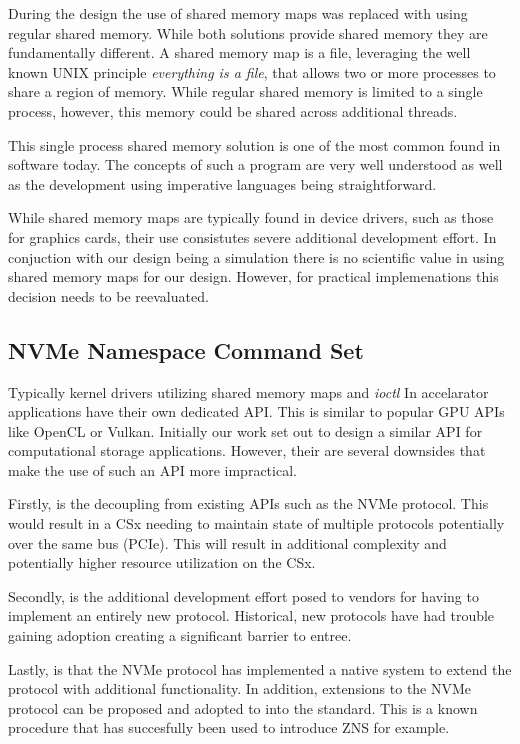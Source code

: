 During the design the use of shared memory maps was replaced with using regular
shared memory. While both solutions provide shared memory they are fundamentally
different. A shared memory map is a file, leveraging the well known UNIX
principle \textit{everything is a file}, that allows two or more processes to
share a region of memory. While regular shared memory is limited to a single
process, however, this memory could be shared across additional threads.

This single process shared memory solution is one of the most common found in
software today. The concepts of such a program are very well understood as
well as the development using imperative languages being straightforward.

While shared memory maps are typically found in device drivers, such as those
for graphics cards, their use consistutes severe additional development effort.
In conjuction with our design being a simulation there is no scientific value in
using shared memory maps for our design. However, for practical implemenations 
this decision needs to be reevaluated.

\subsection{NVMe Namespace Command Set}

Typically kernel drivers utilizing shared memory maps and \textit{ioctl} In
accelarator applications have their own dedicated API. This is similar to
popular GPU APIs like OpenCL or Vulkan. Initially our work set out to design
a similar API for computational storage applications. However, their are several
downsides that make the use of such an API more impractical.

Firstly, is the decoupling from existing APIs such as the NVMe protocol. This
would result in a CSx needing to maintain state of multiple protocols
potentially over the same bus (PCIe). This will result in additional complexity
and potentially higher resource utilization on the CSx.

Secondly, is the additional development effort posed to vendors for having to
implement an entirely new protocol. Historical, new protocols have had trouble
gaining adoption creating a significant barrier to entree.

Lastly, is that the NVMe protocol has implemented a native system to extend the
protocol with additional functionality. In addition, extensions to the NVMe
protocol can be proposed and adopted to into the standard. This is a known
procedure that has succesfully been used to introduce ZNS \cite{nvme-zns} for
example.

